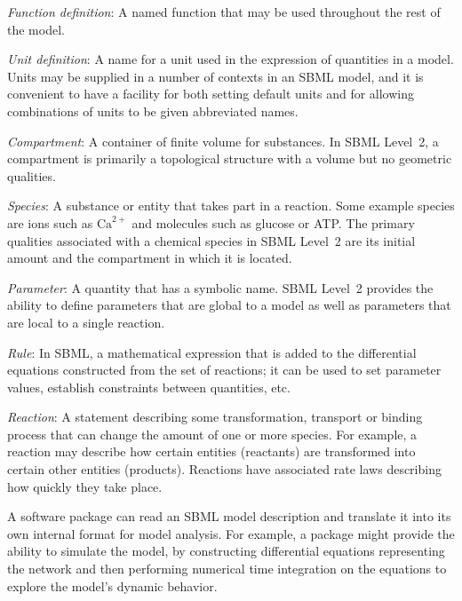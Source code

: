 \documentclass[10pt,twocolumntoc]{cekarticle}
\begin{document}
\begin{description}

\item \emph{Function definition}: A named function that may be used
  throughout the rest of the model.
    
\item \emph{Unit definition}: A name for a unit used in the expression of
  quantities in a model.  Units may be supplied in a number of contexts in
  an SBML model, and it is convenient to have a facility for both setting
  default units and for allowing combinations of units to be given
  abbreviated names.

\item \emph{Compartment}: A container of finite volume for substances.  In
  SBML Level~2, a compartment is primarily a topological structure with a
  volume but no geometric qualities.
  
\item \emph{Species}: A substance or entity that takes part in a reaction.
  Some example species are ions such as $\text{Ca}^{2+}$ and molecules such
  as glucose or ATP.  The primary qualities associated with a chemical
  species in SBML Level~2 are its initial amount and the compartment in
  which it is located.
  
\item \emph{Parameter}: A quantity that has a symbolic name.  SBML Level~2
  provides the ability to define parameters that are global to a model as
  well as parameters that are local to a single reaction.

\item \emph{Rule}: In SBML, a mathematical expression that is added
  to the differential equations constructed from the set of reactions; it
  can be used to set parameter values, establish constraints between
  quantities, etc.

\item \emph{Reaction}: A statement describing some transformation,
  transport or binding process that can change the amount of one or more
  species.  For example, a reaction may describe how certain entities
  (reactants) are transformed into certain other entities (products).
  Reactions have associated rate laws describing how quickly they take
  place.

\end{description}

A software package can read an SBML model description and translate it
into its own internal format for model analysis.  For example, a package
might provide the ability to simulate the model, by constructing
differential equations representing the network and then performing
numerical time integration on the equations to explore the model's dynamic
behavior.
\end{document}
